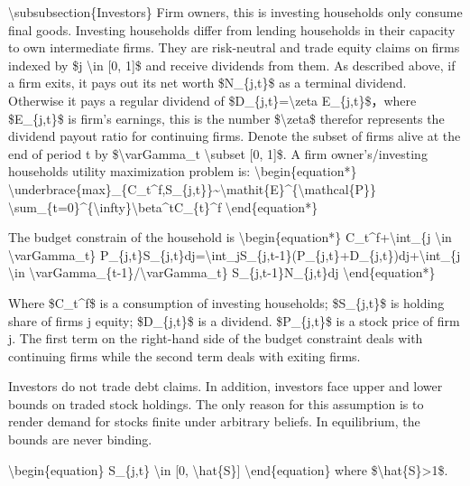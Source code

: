 \documentclass[10pt,math=newtx,citestyle=gb7714-2015,bibstyle=gb7714-2015]{elegantbook}
\begin{document}
	\textbackslash{}subsubsection\{Investors\}
	Firm owners, this is investing households only consume final goods. Investing households differ from lending households in their capacity to own intermediate firms. They are risk-neutral and trade equity claims on firms indexed by \$j \textbackslash{}in [0, 1]\$ and receive dividends from them. As described above, if a firm exits, it pays out its net worth \$N\_\{j,t\}\$ as a terminal dividend. Otherwise it pays a regular dividend of \$D\_\{j,t\}=\textbackslash{}zeta E\_\{j,t\}\$，where \$E\_\{j,t\}\$ is firm's earnings, this is the number \$\textbackslash{}zeta\$ therefor represents the dividend payout ratio for continuing firms. Denote the subset of firms alive at the end of period t by \$\textbackslash{}varGamma\_t \textbackslash{}subset [0, 1]\$. A firm owner’s/investing households utility maximization problem is:
	\textbackslash{}begin\{equation*\}
	\textbackslash{}underbrace\{max\}\_\{C\_t\^{}f,S\_\{j,t\}\}\~{}\textbackslash{}mathit\{E\}\^{}\{\textbackslash{}mathcal\{P\}\} \textbackslash{}sum\_\{t=0\}\^{}\{\textbackslash{}infty\}\textbackslash{}beta\^{}tC\_\{t\}\^{}f
	\textbackslash{}end\{equation*\}
	
	The budget constrain of the household is
	\textbackslash{}begin\{equation*\}
	C\_t\^{}f+\textbackslash{}int\_\{j \textbackslash{}in \textbackslash{}varGamma\_t\} P\_\{j,t\}S\_\{j,t\}dj=\textbackslash{}int\_jS\_\{j,t-1\}(P\_\{j,t\}+D\_\{j,t\})dj+\textbackslash{}int\_\{j \textbackslash{}in \textbackslash{}varGamma\_\{t-1\}/\textbackslash{}varGamma\_t\} S\_\{j,t-1\}N\_\{j,t\}dj
	\textbackslash{}end\{equation*\}
	
	Where \$C\_t\^{}f\$ is a consumption of investing households; \$S\_\{j,t\}\$ is holding share of firms j equity;  \$D\_\{j,t\}\$ is a dividend. \$P\_\{j,t\}\$ is a stock price of firm j. The first term on the right-hand side of the budget constraint deals with continuing firms while the second term deals with exiting firms.
	
	Investors do not trade debt claims. In addition, investors face upper and lower bounds on traded stock holdings. The only reason for this assumption is to render demand for stocks finite under arbitrary beliefs. In equilibrium, the bounds are never binding.
	
	\textbackslash{}begin\{equation\}
	S\_\{j,t\} \textbackslash{}in [0, \textbackslash{}hat\{S\}]
	\textbackslash{}end\{equation\}
	where \$\textbackslash{}hat\{S\}>1\$.
	
\end{document}
